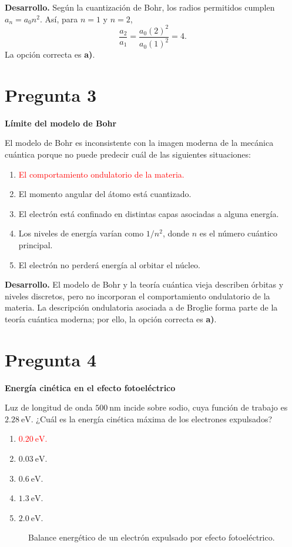 \documentclass[a4paper,11pt]{article}
\newcommand{\pregunta}[2]{\section*{Pregunta #1}\textbf{#2}\par}
\begin{document}
\textbf{Desarrollo.} Según la cuantización de Bohr, los radios permitidos cumplen $a_n=a_0n^2$. Así, para $n=1$ y $n=2$,
\[
\frac{a_2}{a_1}=\frac{a_0(2)^2}{a_0(1)^2}=4.
\]
La opción correcta es \textbf{a)}. \parencite[Sec. 15.5, ec. (15.7), pp. 501--502]{chaparro2026}

\pregunta{3}{Límite del modelo de Bohr}

El modelo de Bohr es inconsistente con la imagen moderna de la mecánica cuántica porque no puede predecir cuál de las siguientes situaciones:

\begin{enumerate}
    \item \textcolor{red}{El comportamiento ondulatorio de la materia.}
    \item El momento angular del átomo está cuantizado.
    \item El electrón está confinado en distintas capas asociadas a alguna energía.
    \item Los niveles de energía varían como $1/n^2$, donde $n$ es el número cuántico principal.
    \item El electrón no perderá energía al orbitar el núcleo.
\end{enumerate}

\textbf{Desarrollo.} El modelo de Bohr y la teoría cuántica vieja describen órbitas y niveles discretos, pero no incorporan el comportamiento ondulatorio de la materia. La descripción ondulatoria asociada a de Broglie forma parte de la teoría cuántica moderna; por ello, la opción correcta es \textbf{a)}. \parencite[Sec. 15.10, pp. 518--520; Sec. 16.3.1, pp. 540--541]{chaparro2026}

\pregunta{4}{Energía cinética en el efecto fotoeléctrico}

Luz de longitud de onda $500\ \mathrm{nm}$ incide sobre sodio, cuya función de trabajo es $2.28\ \mathrm{eV}$. ¿Cuál es la energía cinética máxima de los electrones expulsados?

\begin{enumerate}
    \item \textcolor{red}{$0.20\ \mathrm{eV}$.}
    \item $0.03\ \mathrm{eV}$.
    \item $0.6\ \mathrm{eV}$.
    \item $1.3\ \mathrm{eV}$.
    \item $2.0\ \mathrm{eV}$.
\end{enumerate}

\begin{figure}[H]
\centering

\caption{Balance energético de un electrón expulsado por efecto fotoeléctrico.}
\end{figure}
\end{document}
